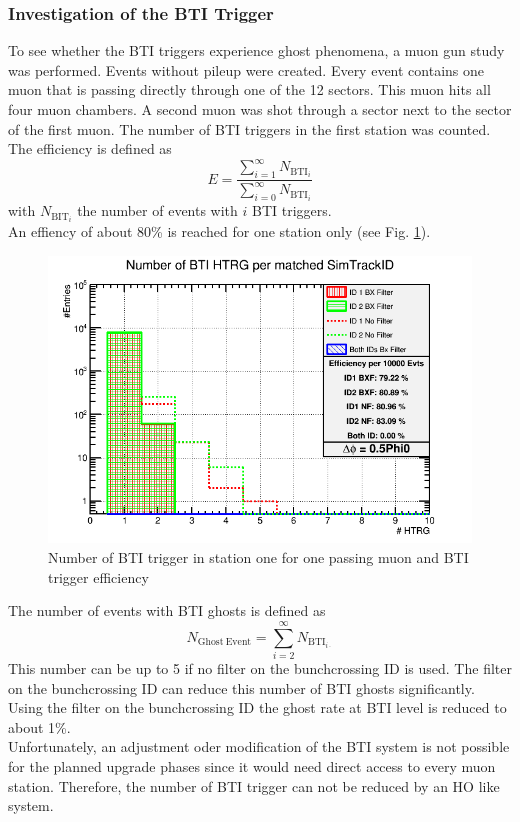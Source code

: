 \subsubsection{Investigation of the BTI Trigger}
To see whether the BTI triggers experience ghost phenomena, a muon gun study was performed. Events without pileup were created. Every event contains one muon that is passing directly through one of the 12 sectors. This muon hits all four muon chambers. A second muon was shot through a sector next to the sector of the first muon. The number of BTI triggers in the first station was counted.\\
The efficiency is defined as
\begin{equation}
E=\frac{\sum_{i = 1}^\infty N_{\mathrm{BTI}_i}}{\sum_{i = 0}^\infty N_{\mathrm{BTI}_i}}
\end{equation}
with $N_{\mathrm{BIT}_i}$ the number of events with $i$ BTI triggers.\\
An effiency of about 80\% is reached for one station only (see Fig. \ref{BTIEfficiency}).
\begin{figure}
\begin{minipage}[t]{0.95\textwidth}
\includegraphics[width=\textwidth]{Figures/scheuch/SectorGunPt100dPhi0_5Phi0_h1dFilteredBtiHitsPerEvtSL1.png}
\caption{Number of BTI trigger in station one for one passing muon and BTI trigger efficiency}
\label{BTIEfficiency}
\end{minipage}
\end{figure}
The number of events with BTI ghosts is defined as
\begin{equation}
N_{\mathrm{Ghost\ Event}} = \sum_{i = 2}^\infty N_{\mathrm{BTI}_{i\cdot}}
\end{equation}
This number can be up to 5 if no filter on the bunchcrossing ID is used. The filter on the bunchcrossing ID can reduce this number of BTI ghosts significantly. Using the filter on the bunchcrossing ID the ghost rate at BTI level is reduced to about 1\%.\\
Unfortunately, an adjustment oder modification of the BTI system is not possible for the planned upgrade phases since it would need direct access to every muon station. Therefore, the number of BTI trigger can not be reduced by an HO like system.